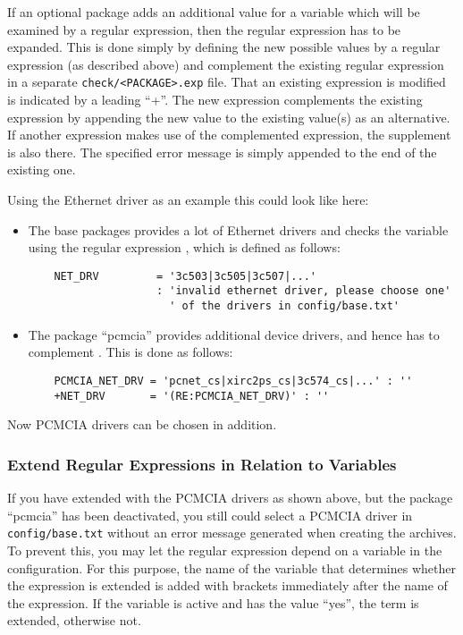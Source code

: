 If an optional package adds an additional value for a variable
which will be examined by a regular expression, then the regular
expression has to be expanded. This is done simply by defining the
new possible values by a regular expression (as described above) and
complement the existing regular expression in a separate \texttt{check/<PACKAGE>.exp}
file. That an existing expression is modified is indicated by a leading ``+''.
The new expression complements the existing expression by appending the new value
to the existing value(s) as an alternative. If another expression makes use of the
complemented expression, the supplement is also there. The specified error message
is simply appended to the end of the existing one.

Using the Ethernet driver as an example this could look like here:

\begin{itemize}
\item The base packages provides a lot of Ethernet drivers and checks
  the variable  using the regular expression ,
  which is defined as follows:

\begin{example}
\begin{verbatim}
    NET_DRV         = '3c503|3c505|3c507|...'
                    : 'invalid ethernet driver, please choose one'
                      ' of the drivers in config/base.txt'
\end{verbatim}
\end{example}
\item The package ``pcmcia'' provides additional device drivers,
  and hence has to complement . This is done as follows:

\begin{example}
\begin{verbatim}
    PCMCIA_NET_DRV = 'pcnet_cs|xirc2ps_cs|3c574_cs|...' : ''
    +NET_DRV       = '(RE:PCMCIA_NET_DRV)' : ''
\end{verbatim}
\end{example}
\end{itemize}

Now PCMCIA drivers can be chosen in addition.

\subsubsection{Extend Regular Expressions in Relation to  Variables}

If you have extended  with the PCMCIA drivers as shown above, but
the package ``pcmcia'' has been deactivated, you still could select a PCMCIA driver
in \texttt{config/base.txt} without an error message generated when creating the archives.
To prevent this, you may let the regular expression depend on a  variable in the
configuration. For this purpose, the name of the variable that determines whether the
expression is extended is added with brackets immediately after the name of the expression.
If the variable is active and has the value ``yes'', the term is extended,
otherwise not.

